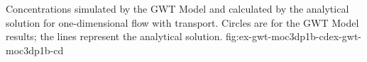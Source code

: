\begin{StandardFigure}{
                                     Concentrations simulated by the \mf GWT Model and calculated by the analytical solution for one-dimensional flow with transport.  Circles are for the GWT Model results; the lines represent the analytical solution.
                                     }{fig:ex-gwt-moc3dp1b-cd}{ex-gwt-moc3dp1b-cd}
\end{StandardFigure}            

